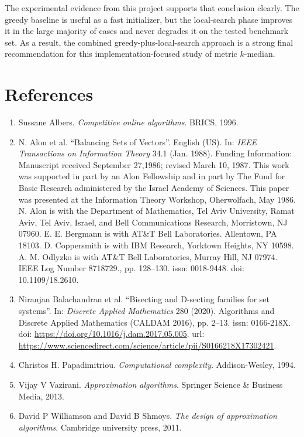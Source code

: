 \documentclass[11pt]{article}
\begin{document}
The experimental evidence from this project supports that conclusion clearly. The greedy baseline is useful as a fast initializer, but the local-search phase improves it in the large majority of cases and never degrades it on the tested benchmark set. As a result, the combined greedy-plus-local-search approach is a strong final recommendation for this implementation-focused study of metric $k$-median.

\section{References}
\begin{enumerate}
    \item Sussane Albers. \textit{Competitive online algorithms}. BRICS, 1996.
    \item N. Alon et al. ``Balancing Sets of Vectors''. English (US). In: \textit{IEEE Transactions on Information Theory} 34.1 (Jan. 1988). Funding Information: Manuscript received September 27,1986; revised March 10, 1987. This work was supported in part by an Alon Fellowship and in part by The Fund for Basic Research administered by the Israel Academy of Sciences. This paper was presented at the Information Theory Workshop, Oherwolfach, May 1986. N. Alon is with the Department of Mathematics, Tel Aviv University, Ramat Aviv, Tel Aviv, Israel, and Bell Communications Research, Morristown, NJ 07960. E. E. Bergmann is with AT\&T Bell Laboratories. Allentown, PA 18103. D. Coppersmith is with IBM Research, Yorktown Heights, NY 10598. A. M. Odlyzko is with AT\&T Bell Laboratories, Murray Hill, NJ 07974. IEEE Log Number 8718729., pp. 128--130. issn: 0018-9448. doi: 10.1109/18.2610.
    \item Niranjan Balachandran et al. ``Bisecting and D-secting families for set systems''. In: \textit{Discrete Applied Mathematics} 280 (2020). Algorithms and Discrete Applied Mathematics (CALDAM 2016), pp. 2--13. issn: 0166-218X. doi: \url{https://doi.org/10.1016/j.dam.2017.05.005}. url: \url{https://www.sciencedirect.com/science/article/pii/S0166218X17302421}.
    \item Christos H. Papadimitriou. \textit{Computational complexity}. Addison-Wesley, 1994.
    \item Vijay V Vazirani. \textit{Approximation algorithms}. Springer Science \& Business Media, 2013.
    \item David P Williamson and David B Shmoys. \textit{The design of approximation algorithms}. Cambridge university press, 2011.
\end{enumerate}
\end{document}
